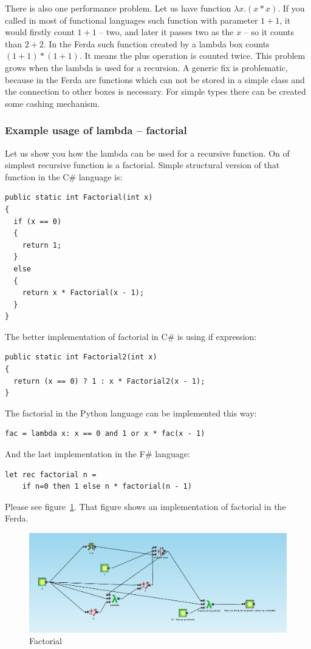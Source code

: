 \documentclass[a4paper,12pt]{book}
\begin{document}
There is also one performance problem. Let us have function $\lambda x.(x*x)$. If you called in most of functional languages such function with parameter $1+1$, it would firstly count $1+1$ -- two, and later it passes two as the $x$ -- so it counts than $2+2$. In the Ferda such function created by a lambda box counts $(1+1)*(1+1)$. It means the plus operation is counted twice. This problem grows when the lambda is used for a recursion. A generic fix is problematic, because in the Ferda are functions which can not be stored in a simple class and the connection to other boxes is necessary. For simple types there can be created some cashing mechanism.

\subsubsection{Example usage of lambda -- factorial}
Let us show you how the lambda can be used for a recursive function. On of simplest recursive function is a factorial. Simple structural version of that function in the C\# language is: 
\begin{verbatim}
public static int Factorial(int x)
{
  if (x == 0)
  {
    return 1;
  }
  else
  {
    return x * Factorial(x - 1);
  }
}
\end{verbatim}
	
The better implementation of factorial in C\# is using if expression:
\begin{verbatim}
public static int Factorial2(int x)
{
  return (x == 0) ? 1 : x * Factorial2(x - 1);
}
\end{verbatim}

The factorial in the Python language can be implemented this way:
\begin{verbatim}
fac = lambda x: x == 0 and 1 or x * fac(x - 1)
\end{verbatim}

And the last implementation in the F\# language:
\begin{verbatim}
let rec factorial n =
    if n=0 then 1 else n * factorial(n - 1)
\end{verbatim}

Please see figure~\ref{fig:factorial}. That figure shows an implementation of factorial in the Ferda.
\begin{figure}
	\includegraphics[width=1\textwidth]{faktorial}
	\caption{Factorial}
	\label{fig:factorial}
\end{figure}
\end{document}
